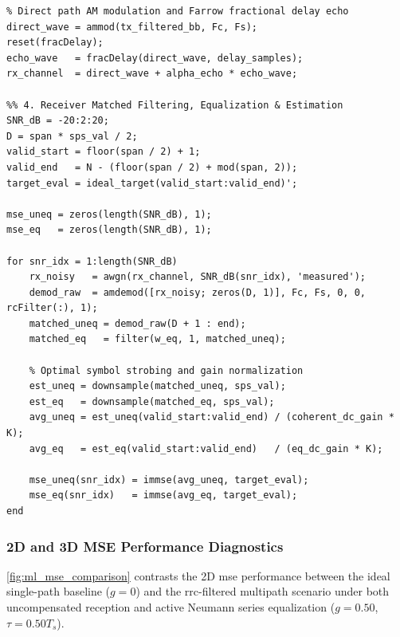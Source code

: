 \documentclass[Markos_Delaportas_1316.tex]{subfiles}
\begin{document}
\begin{lstlisting}
% Direct path AM modulation and Farrow fractional delay echo
direct_wave = ammod(tx_filtered_bb, Fc, Fs);
reset(fracDelay);
echo_wave   = fracDelay(direct_wave, delay_samples);
rx_channel  = direct_wave + alpha_echo * echo_wave;

%% 4. Receiver Matched Filtering, Equalization & Estimation
SNR_dB = -20:2:20;
D = span * sps_val / 2;
valid_start = floor(span / 2) + 1;
valid_end   = N - (floor(span / 2) + mod(span, 2));
target_eval = ideal_target(valid_start:valid_end)';

mse_uneq = zeros(length(SNR_dB), 1);
mse_eq   = zeros(length(SNR_dB), 1);

for snr_idx = 1:length(SNR_dB)
    rx_noisy   = awgn(rx_channel, SNR_dB(snr_idx), 'measured');
    demod_raw  = amdemod([rx_noisy; zeros(D, 1)], Fc, Fs, 0, 0, rcFilter(:), 1);
    matched_uneq = demod_raw(D + 1 : end);
    matched_eq   = filter(w_eq, 1, matched_uneq);

    % Optimal symbol strobing and gain normalization
    est_uneq = downsample(matched_uneq, sps_val);
    est_eq   = downsample(matched_eq, sps_val);
    avg_uneq = est_uneq(valid_start:valid_end) / (coherent_dc_gain * K);
    avg_eq   = est_eq(valid_start:valid_end)   / (eq_dc_gain * K);

    mse_uneq(snr_idx) = immse(avg_uneq, target_eval);
    mse_eq(snr_idx)   = immse(avg_eq, target_eval);
end
    \end{lstlisting}

\subsubsection{2D and 3D MSE Performance Diagnostics}
\label{subsubsec:2d_3d_mse_diagnostics}
\cref{fig:ml_mse_comparison} contrasts the 2D \gls{mse} performance
between the ideal single-path baseline ($g = 0$)
and the \gls{rrc}-filtered multipath scenario under both uncompensated
reception and active Neumann series equalization ($g = 0.50$, $\tau = 0.50 T_s$).
\end{document}
